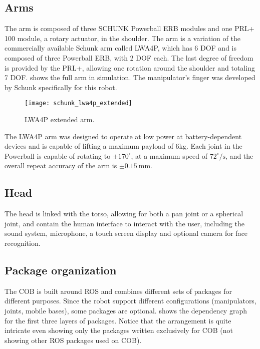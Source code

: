 \subsection{Arms}

The arm is composed of three SCHUNK Powerball ERB modules and one PRL+ 100 module, a rotary actuator, in the shoulder. The arm is a variation of the commercially available Schunk arm called LWA4P, which has 6 DOF and is composed of three Powerball ERB, with 2 DOF each. The last degree of freedom is provided by the PRL+, allowing one rotation around the shoulder and totaling 7 DOF.  shows the full arm in simulation. The manipulator's finger was developed by Schunk specifically for this robot.

\begin{figure}[!ht]
    \centering
    \texttt{[image: schunk\_lwa4p\_extended]}
    \caption{LWA4P extended arm.}
    \label{fig:schunk_lwa4p_extended}
\end{figure}

The LWA4P arm was designed to operate at low power at battery-dependent devices and is capable of lifting a maximum payload of 6kg. Each joint in the Powerball is capable of rotating to $\pm 170^\circ$, at a maximum speed of $72^\circ /\text{s}$, and the overall repeat accuracy of the arm is $\pm 0.15 \ \text{mm}$.


\subsection{Head}

The head is linked with the torso, allowing for both a pan joint or a spherical joint, and contain the human interface to interact with the user, including the sound system, microphone, a touch screen display and optional camera for face recognition.


\subsection{Package organization}

The COB is built around ROS and combines different sets of packages for different purposes. Since the robot support different configurations (manipulators, joints, mobile bases), some packages are optional.  shows the dependency graph for the first three layers of packages. Notice that the arrangement is quite intricate even showing only the packages written exclusively for COB (not showing other ROS packages used on COB).

